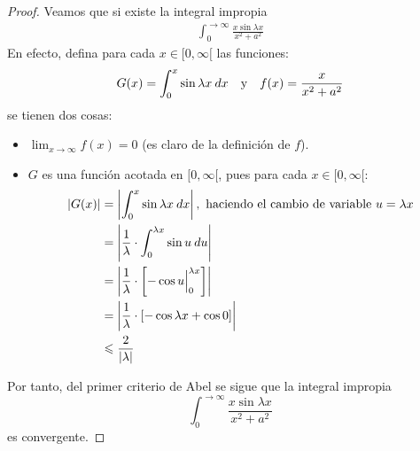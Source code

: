 \documentclass[12pt]{report}
\theoremstyle{largebreak}
\renewcommand{\leq}{\ensuremath{\leqslant}}
\newcommand\abs[1]{\ensuremath{\left|#1\right|}}
\begin{document}
\begin{proof}
        Veamos que si existe la integral impropia
        \begin{equation*}
            \begin{split}
                \int_{ 0}^{\rightarrow\infty}\frac{x\sin\lambda x}{x^2+a^2}
            \end{split}
        \end{equation*}
        En efecto, defina para cada $x\in[0,\infty[$ las funciones:
        \begin{equation*}
            G(x)=\int_{ 0}^x \sin\lambda x\:dx\quad\textup{y}\quad f(x)=\frac{x}{x^2+a^2}
        \end{equation*}
        se tienen dos cosas:
        \begin{itemize}
            \item $\lim_{x\rightarrow\infty}f(x)=0$ (es claro de la definición de $f$).
            \item $G$ es una función acotada en $[0,\infty[$, pues para cada $x\in[0,\infty[$:
            \begin{equation*}
                \begin{split}
                    \abs{G(x)}&=\abs{\int_{ 0}^x \sin\lambda x\:dx},\textup{ haciendo el cambio de variable }u=\lambda x\\
                    &=\abs{\frac{1}{\lambda}\cdot \int_{ 0}^{\lambda x}\sin u\:du}\\
                    &=\abs{\frac{1}{\lambda}\cdot\left[-\cos u\Big|_{ 0}^{\lambda x} \right]}\\
                    &=\abs{\frac{1}{\lambda}\cdot\left[-\cos \lambda x+\cos 0\right]}\\
                    &\leq\frac{2}{\abs{\lambda}}
                \end{split}
            \end{equation*}
        \end{itemize}
        Por tanto, del primer criterio de Abel se sigue que la integral impropia
        \begin{equation*}
            \int_{ 0}^{\rightarrow\infty}\frac{x\sin\lambda x}{x^2+a^2}
        \end{equation*}
        es convergente.


\end{proof}
\end{document}
